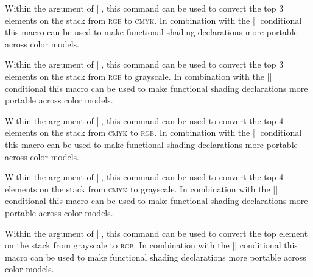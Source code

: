 \begin{command}{\pgffuncshadingrgbtocmyk}
  Within the  argument of
  |\pgfdeclarefunctionalshading|, this command can be used to convert the
  top 3 elements on the stack from \textsc{rgb} to \textsc{cmyk}. In
  combination with the |\ifpgfshadingmodelcmyk| conditional this macro can
  be used to make functional shading declarations more portable across color
  models.
\end{command}

\begin{command}{\pgffuncshadingrgbtogray}
  Within the  argument of
  |\pgfdeclarefunctionalshading|, this command can be used to convert the
  top 3 elements on the stack from \textsc{rgb} to grayscale. In combination
  with the |\ifpgfshadingmodelgray| conditional this macro can be used to
  make functional shading declarations more portable across color models.
\end{command}

\begin{command}{\pgffuncshadingcmyktorgb}
  Within the  argument of
  |\pgfdeclarefunctionalshading|, this command can be used to convert the
  top 4 elements on the stack from \textsc{cmyk} to \textsc{rgb}. In
  combination with the |\ifpgfshadingmodelrgb| conditional this macro can be
  used to make functional shading declarations more portable across color
  models.
\end{command}

\begin{command}{\pgffuncshadingcmyktogray}
  Within the  argument of
  |\pgfdeclarefunctionalshading|, this command can be used to convert the
  top 4 elements on the stack from \textsc{cmyk} to grayscale. In combination
  with the |\ifpgfshadingmodelgray| conditional this macro can be used to
  make functional shading declarations more portable across color models.
\end{command}

\begin{command}{\pgffuncshadinggraytorgb}
  Within the  argument of
  |\pgfdeclarefunctionalshading|, this command can be used to convert the
  top element on the stack from grayscale to \textsc{rgb}. In combination with
  the |\ifpgfshadingmodelrgb| conditional this macro can be used to make
  functional shading declarations more portable across color models.
\end{command}

